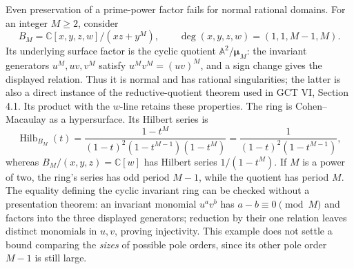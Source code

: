 \documentclass[11pt,a4paper]{article}
\begin{document}
Even preservation of a prime-power factor fails for normal rational
domains. For an integer $M\ge2$, consider
\[
 B_M=\mathbb C[x,y,z,w]/(xz+y^M),\qquad
 \deg(x,y,z,w)=(1,1,M-1,M).
 \tag{P-F20d}
\]
Its underlying surface factor is the cyclic quotient
$\mathbb A^2/\boldsymbol\mu_M$: the invariant generators
$u^M,uv,v^M$ satisfy $u^Mv^M=(uv)^M$, and a sign change gives
the displayed relation. Thus it is normal and has rational
singularities; the latter is also a direct instance of the
reductive-quotient theorem used in GCT VI, Section 4.1. Its
product with the $w$-line retains these properties. The ring is
Cohen--Macaulay as a hypersurface. Its Hilbert series is
\[
 \operatorname{Hilb}_{B_M}(t)
  =\frac{1-t^M}
     {(1-t)^2(1-t^{M-1})(1-t^M)}
  =\frac1{(1-t)^2(1-t^{M-1})},
\]
whereas $B_M/(x,y,z)=\mathbb C[w]$ has Hilbert series
$1/(1-t^M)$. If $M$ is a power of two, the ring's series has
odd period $M-1$, while the quotient has period $M$.
The equality defining the cyclic invariant ring can be checked
without a presentation theorem: an invariant monomial $u^av^b$
has $a-b\equiv0\pmod M$ and factors into the three displayed
generators; reduction by their one relation leaves distinct
monomials in $u,v$, proving injectivity. This example does not
settle a bound comparing the \emph{sizes} of possible pole orders,
since its other pole order $M-1$ is still large.
\end{document}

